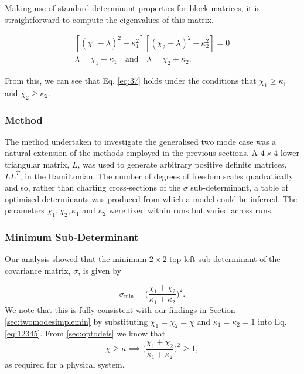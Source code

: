 \documentclass[11pt,a4paper]{article}
\numberwithin{equation}{section}
\begin{document}
	Making use of standard determinant properties for block matrices, it is straightforward to compute the eigenvalues of this matrix.
	
	\begin{align*}
	&[(\chi_1- \lambda)^2 - \kappa_1^2][(\chi_2- \lambda)^2 - \kappa_2^2]=0&\\
	&\lambda=\chi_1\pm\kappa_1 \quad\text{and}\quad \lambda=\chi_2\pm\kappa_2 .&
	\end{align*}
	
	From this, we can see that Eq. \ref{eq:37} holds under the conditions that $\chi_1 \geq \kappa_1$ and $\chi_2 \geq \kappa_2$.
	
	
	\iffalse
	chi and kappa are, respectively, the noise (in units of frequency) and loss rates. `an assumption one needs to make for the cooling scenario to make sense: you will need to couple your system of interest (say, mechanics) with an auxiliary system (say, light) that will be asymptotically cooler, and that cools fast enough, otherwise the best is likely to be doing nothing' $\chi_1, \chi_2, \kappa_1, \kappa_2$? Check what ch1,2 kappa1,2 actually are.
	\fi
	
	\subsubsection{Method}
	\label{sec:twomodegeneralmethod}	
	
	The method undertaken to investigate the generalised two mode case was a natural extension of the methods employed in the previous sections. A $4\times4$ lower triangular matrix, $L$, was used to generate arbitrary positive definite matrices, $LL^T$, in the Hamiltonian. The number of degrees of freedom scales quadratically and so, rather than charting cross-sections of the $\sigma$ sub-determinant, a table of optimised determinants was produced from which a model could be inferred. The parameters $\chi_1, \chi_2, \kappa_1$ and $\kappa_2$ were fixed within runs but varied across runs.

	\subsubsection{Minimum Sub-Determinant}
	Our analysis showed that the minimum $2 \times 2$ top-left sub-determinant of the covariance matrix, $\sigma$, is given by
	
	\begin{equation}\label{eq:12345}
	\sigma_\text{min} = \Big(\dfrac{\chi_1 + \chi_2}{\kappa_1 + \kappa_2}\Big)^2.
	\end{equation}  
	We note that this is fully consistent with our findings in Section \ref{sec:twomodesimplemin} by substituting $\chi_1=\chi_2=\chi$ and $\kappa_1=\kappa_2=1$ into Eq. \ref{eq:12345}. From \ref{sec:optodefs} we know that 
	\begin{equation*}
	\chi \geq \kappa \implies	\Big(\dfrac{\chi_1 + \chi_2}{\kappa_1 + \kappa_2}\Big)^2 \geq 1,
	\end{equation*}
	as required for a physical system. 
	
\end{document}

